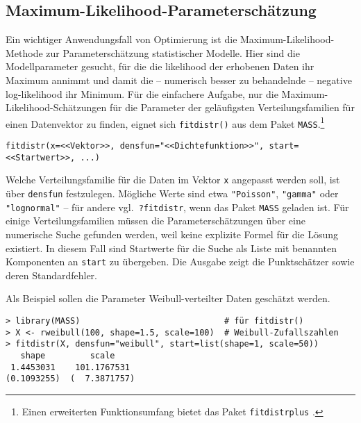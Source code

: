 \subsection{Maximum-Likelihood-Parameterschätzung}
\label{sec:fitDistr}

Ein wichtiger Anwendungsfall von Optimierung ist die Maximum-Likelihood-Methode zur Parameterschätzung statistischer Modelle. Hier sind die Modellparameter gesucht, für die die likelihood der erhobenen Daten ihr Maximum annimmt und damit die -- numerisch besser zu behandelnde -- negative log-likelihood ihr Minimum. Für die einfachere Aufgabe, nur die Maximum-Likelihood-Schätzungen für die Parameter der geläufigsten Verteilungsfamilien für einen Datenvektor zu finden, eignet sich \lstinline!fitdistr()! aus dem Paket \lstinline!MASS!.\footnote{Einen erweiterten Funktionsumfang bietet das Paket \lstinline!fitdistrplus! \cite{Delignette2015}.}
\begin{lstlisting}
fitdistr(x=<<Vektor>>, densfun="<<Dichtefunktion>>", start=<<Startwert>>, ...)
\end{lstlisting}

Welche Verteilungsfamilie für die Daten im Vektor \lstinline!x! angepasst werden soll, ist über \lstinline!densfun! festzulegen. Mögliche Werte sind etwa \lstinline!"Poisson"!, \lstinline!"gamma"! oder \lstinline!"lognormal"! -- für andere vgl.\ \lstinline!?fitdistr!, wenn das Paket \lstinline!MASS! geladen ist. Für einige Verteilungsfamilien müssen die Parameterschätzungen über eine numerische Suche gefunden werden, weil keine explizite Formel für die Lösung existiert. In diesem Fall sind Startwerte für die Suche als Liste mit benannten Komponenten an \lstinline!start! zu übergeben. Die Ausgabe zeigt die Punktschätzer sowie deren Standardfehler.

Als Beispiel sollen die Parameter Weibull-verteilter Daten geschätzt werden.
\begin{lstlisting}
> library(MASS)                             # für fitdistr()
> X <- rweibull(100, shape=1.5, scale=100)  # Weibull-Zufallszahlen
> fitdistr(X, densfun="weibull", start=list(shape=1, scale=50))
   shape         scale   
 1.4453031    101.1767531 
(0.1093255)  (  7.3871757)
\end{lstlisting}

